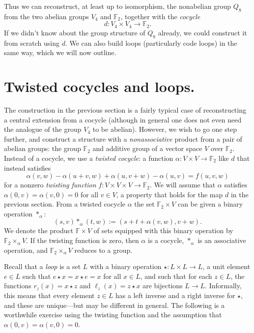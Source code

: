 \documentclass{article}
\theoremstyle{plain}
\theoremstyle{definition}
\def \FF {\mathbb{F}}
\begin{document}
Thus we can reconstruct, at least up to isomorphism, the nonabelian group $Q_8$ from the two abelian groups $V_4$ and $\FF_2$, together with the \emph{cocycle} 
\[
	d\colon V_4\times V_4\to \FF_2.
\]
If we didn't know about the group structure of $Q_8$ already, we could construct it from scratch using $d$.
We can also build loops (particularly code loops) in the same way, which we will now outline.


\section{Twisted cocycles and loops.}

The construction in the previous section is a fairly typical case of reconstructing a central extension from a cocycle (although in general one does not even need the analogue of the group $V_4$ to be abelian). 
However, we wish to go one step further, and construct a structure with a \emph{nonassociative} product from a pair of abelian groups: the group $\FF_2$ and additive group of a vector space $V$ over $\FF_2$.
Instead of a cocycle, we use a \emph{twisted cocycle}: a function $\alpha\colon V\times V \to \FF_2$ like $d$ that instead satisfies
\[
	\alpha(v,w)-\alpha(u+v,w)+\alpha(u,v+w)-\alpha(u,v) = f(u,v,w)
\]
for a nonzero \emph{twisting function} $f\colon V\times V\times V \to \FF_2$. We will assume that $\alpha$ satisfies $\alpha(0,v)=\alpha(v,0) = 0$ for all $v\in V$, a property that holds for the map $d$ in the previous section. From a twisted cocycle $\alpha$ the set $\FF_2 \times V$ can be given a binary operation $\ast_\alpha$:
\begin{equation}\label{eq:loop_extension_prod}
	(s,v)\ast_\alpha(t,w):=(s+ t+ \alpha(v,w),v+w).
\end{equation}
We denote the product $\FF \times V$ of sets equipped with this binary operation by $\FF_2\times_\alpha V$. If the twisting function is zero, then $\alpha$ is a cocycle, $\ast_\alpha$ is an associative operation, and $\FF_2\times_\alpha V$ reduces to a group.

Recall that a \emph{loop} is a set $L$ with a binary operation $\star\colon L\times L \to L$, a unit element $e\in L$ such that $e\star x = x \star e = x$ for all $x\in L$, and such that for each $z\in L$, the functions $r_z(x) = x \star z$ and $\ell_z(x)=z\star x$ are bijections $L\to L$. 
Informally, this means that every element $z\in L$ has a left inverse and a right inverse for $\star$, and these are unique---but may be different in general. 
The following is a worthwhile exercise using the twisting function and the assumption that $\alpha(0,v)=\alpha(v,0)=0$.
\end{document}
